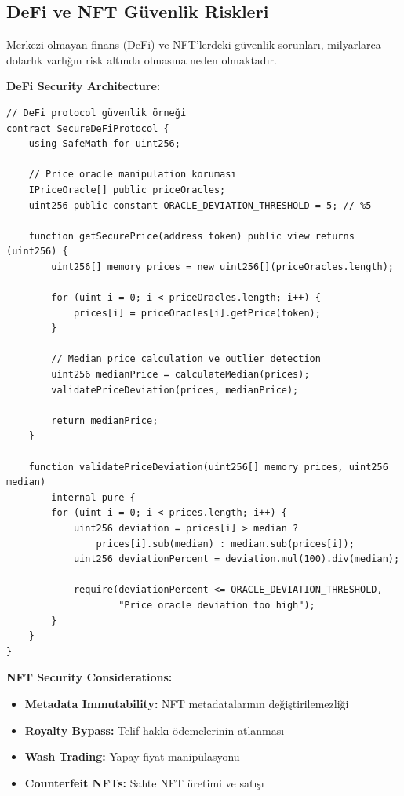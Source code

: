 \subsection{DeFi ve NFT Güvenlik Riskleri}

Merkezi olmayan finans (DeFi) ve NFT'lerdeki güvenlik sorunları, milyarlarca dolarlık varlığın risk altında olmasına neden olmaktadır.

\textbf{DeFi Security Architecture:}
\begin{lstlisting}[breaklines=true,basicstyle=\ttfamily\footnotesize]
// DeFi protocol güvenlik örneği
contract SecureDeFiProtocol {
    using SafeMath for uint256;
    
    // Price oracle manipulation koruması
    IPriceOracle[] public priceOracles;
    uint256 public constant ORACLE_DEVIATION_THRESHOLD = 5; // %5
    
    function getSecurePrice(address token) public view returns (uint256) {
        uint256[] memory prices = new uint256[](priceOracles.length);
        
        for (uint i = 0; i < priceOracles.length; i++) {
            prices[i] = priceOracles[i].getPrice(token);
        }
        
        // Median price calculation ve outlier detection
        uint256 medianPrice = calculateMedian(prices);
        validatePriceDeviation(prices, medianPrice);
        
        return medianPrice;
    }
    
    function validatePriceDeviation(uint256[] memory prices, uint256 median) 
        internal pure {
        for (uint i = 0; i < prices.length; i++) {
            uint256 deviation = prices[i] > median ? 
                prices[i].sub(median) : median.sub(prices[i]);
            uint256 deviationPercent = deviation.mul(100).div(median);
            
            require(deviationPercent <= ORACLE_DEVIATION_THRESHOLD, 
                    "Price oracle deviation too high");
        }
    }
}
\end{lstlisting}

\textbf{NFT Security Considerations:}
\begin{itemize}
    \item \textbf{Metadata Immutability:} NFT metadatalarının değiştirilemezliği
    \item \textbf{Royalty Bypass:} Telif hakkı ödemelerinin atlanması
    \item \textbf{Wash Trading:} Yapay fiyat manipülasyonu
    \item \textbf{Counterfeit NFTs:} Sahte NFT üretimi ve satışı
\end{itemize}

